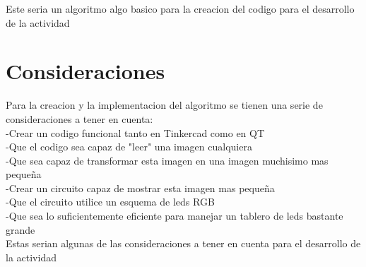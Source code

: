 \documentclass{article}
\begin{document}
Este seria un algoritmo algo basico para la creacion del codigo para el desarrollo de la actividad
\newpage

\section{Consideraciones} \label{consideraciones}
Para la creacion y la implementacion del algoritmo se tienen una serie de consideraciones a tener en cuenta:\\
-Crear un codigo funcional tanto en Tinkercad como en QT\\
-Que el codigo sea capaz de "leer" una imagen cualquiera\\
-Que sea capaz de transformar esta imagen en una imagen muchisimo mas pequeña\\
-Crear un circuito capaz de mostrar esta imagen mas pequeña\\
-Que el circuito utilice un esquema de leds RGB\\
-Que sea lo suficientemente eficiente para manejar un tablero de leds bastante grande\\
Estas serian algunas de las consideraciones a tener en cuenta para el desarrollo de la actividad
\end{document}
